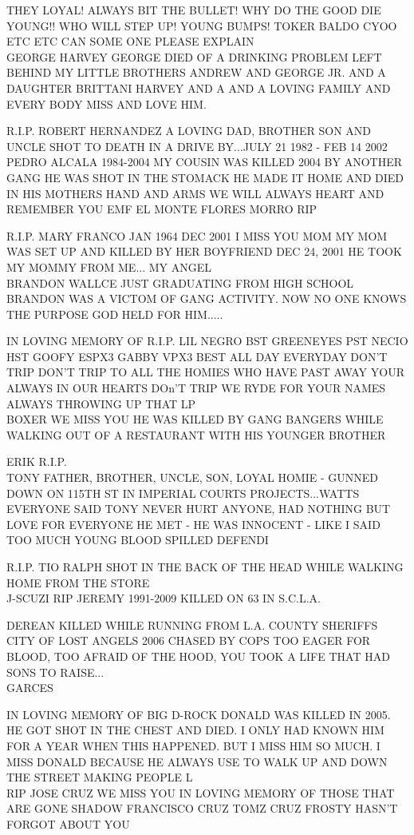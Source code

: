 \documentclass[10pt,letterpaper]{article}
\begin{document}
THEY LOYAL!  ALWAYS BIT THE BULLET!  WHY DO THE GOOD DIE YOUNG!! WHO WILL STEP UP!  YOUNG BUMPS! TOKER BALDO CYOO ETC ETC CAN SOME ONE PLEASE EXPLAIN\\
GEORGE HARVEY GEORGE DIED OF A DRINKING PROBLEM LEFT BEHIND MY LITTLE BROTHERS ANDREW AND GEORGE JR. AND A DAUGHTER BRITTANI HARVEY AND A AND A LOVING FAMILY AND EVERY BODY MISS AND LOVE HIM.

R.I.P. ROBERT HERNANDEZ A LOVING DAD, BROTHER SON AND UNCLE SHOT TO DEATH IN A DRIVE BY...JULY 21 1982 {-} FEB 14 2002\\
PEDRO ALCALA 1984{-}2004 MY COUSIN WAS KILLED 2004 BY ANOTHER GANG HE WAS SHOT IN THE STOMACK HE MADE IT HOME AND DIED IN HIS MOTHERS HAND AND ARMS WE WILL ALWAYS HEART AND REMEMBER YOU EMF EL MONTE FLORES MORRO RIP

R.I.P. MARY FRANCO JAN 1964 DEC 2001 I MISS YOU MOM MY MOM WAS SET UP AND KILLED BY HER BOYFRIEND DEC 24, 2001 HE TOOK MY MOMMY FROM ME... MY ANGEL\\
BRANDON WALLCE JUST GRADUATING FROM HIGH SCHOOL BRANDON WAS A VICTOM OF GANG ACTIVITY.  NOW NO ONE KNOWS THE PURPOSE GOD HELD FOR HIM.....

IN LOVING MEMORY OF R.I.P. LIL NEGRO BST GREENEYES PST NECIO HST GOOFY ESPX3 GABBY VPX3 BEST ALL DAY EVERYDAY DON'T TRIP DON'T TRIP TO ALL THE HOMIES WHO HAVE PAST AWAY YOUR ALWAYS IN OUR HEARTS DOn'T TRIP WE RYDE FOR YOUR NAMES ALWAYS THROWING UP THAT LP\\
BOXER WE MISS YOU HE WAS KILLED BY GANG BANGERS WHILE WALKING OUT OF A RESTAURANT WITH HIS YOUNGER BROTHER

ERIK R.I.P.\\
TONY FATHER, BROTHER, UNCLE, SON, LOYAL HOMIE {-} GUNNED DOWN ON 115TH ST IN IMPERIAL COURTS PROJECTS...WATTS EVERYONE SAID TONY NEVER HURT ANYONE, HAD NOTHING BUT LOVE FOR EVERYONE HE MET {-} HE WAS INNOCENT {-} LIKE I SAID TOO MUCH YOUNG BLOOD SPILLED DEFENDI

R.I.P. TIO RALPH SHOT IN THE BACK OF THE HEAD WHILE WALKING HOME FROM THE STORE\\
J{-}SCUZI RIP JEREMY 1991{-}2009 KILLED ON 63 IN S.C.L.A.

DEREAN KILLED WHILE RUNNING FROM L.A. COUNTY SHERIFFS CITY OF LOST ANGELS 2006 CHASED BY COPS TOO EAGER FOR BLOOD, TOO AFRAID OF THE HOOD, YOU TOOK A LIFE THAT HAD SONS TO RAISE...\\
GARCES

IN LOVING MEMORY OF BIG D{-}ROCK DONALD WAS KILLED IN 2005.  HE GOT SHOT IN THE CHEST AND DIED.  I ONLY HAD KNOWN HIM FOR A YEAR WHEN THIS HAPPENED.  BUT I MISS HIM SO MUCH.  I MISS DONALD BECAUSE HE ALWAYS USE TO WALK UP AND DOWN THE STREET MAKING PEOPLE L\\
RIP JOSE CRUZ WE MISS YOU IN LOVING MEMORY OF THOSE THAT ARE GONE SHADOW FRANCISCO CRUZ TOMZ CRUZ FROSTY HASN'T FORGOT ABOUT YOU
\end{document}
